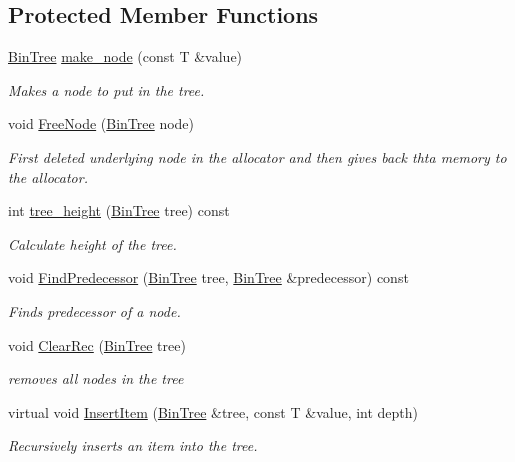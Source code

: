 \subsection*{Protected Member Functions}
\begin{DoxyCompactItemize}
\item 
\hyperlink{classBSTree_ae961195e523a45be64a981840e953b67}{Bin\-Tree} \hyperlink{classBSTree_a246963de859d3fc8cb7c9d5a2c2bf87f}{make\-\_\-node} (const T \&value)
\begin{DoxyCompactList}\small\item\em Makes a node to put in the tree. \end{DoxyCompactList}\item 
void \hyperlink{classBSTree_ad1c3dedcd1d2172d767058a5afc48700}{Free\-Node} (\hyperlink{classBSTree_ae961195e523a45be64a981840e953b67}{Bin\-Tree} node)
\begin{DoxyCompactList}\small\item\em First deleted underlying node in the allocator and then gives back thta memory to the allocator. \end{DoxyCompactList}\item 
int \hyperlink{classBSTree_aaa3acfb629509ec0797c149e0307b59e}{tree\-\_\-height} (\hyperlink{classBSTree_ae961195e523a45be64a981840e953b67}{Bin\-Tree} tree) const 
\begin{DoxyCompactList}\small\item\em Calculate height of the tree. \end{DoxyCompactList}\item 
void \hyperlink{classBSTree_a7c864388c9ce422b7329e7561c30a316}{Find\-Predecessor} (\hyperlink{classBSTree_ae961195e523a45be64a981840e953b67}{Bin\-Tree} tree, \hyperlink{classBSTree_ae961195e523a45be64a981840e953b67}{Bin\-Tree} \&predecessor) const 
\begin{DoxyCompactList}\small\item\em Finds predecessor of a node. \end{DoxyCompactList}\item 
void \hyperlink{classBSTree_a9aee3782f0daf87e0e2ec1f3aedb4f5e}{Clear\-Rec} (\hyperlink{classBSTree_ae961195e523a45be64a981840e953b67}{Bin\-Tree} tree)
\begin{DoxyCompactList}\small\item\em removes all nodes in the tree \end{DoxyCompactList}\item 
virtual void \hyperlink{classBSTree_aa32cf54d2ea8cfc413293d0538446aad}{Insert\-Item} (\hyperlink{classBSTree_ae961195e523a45be64a981840e953b67}{Bin\-Tree} \&tree, const T \&value, int depth)
\begin{DoxyCompactList}\small\item\em Recursively inserts an item into the tree. \end{DoxyCompactList}\end{DoxyCompactItemize}
